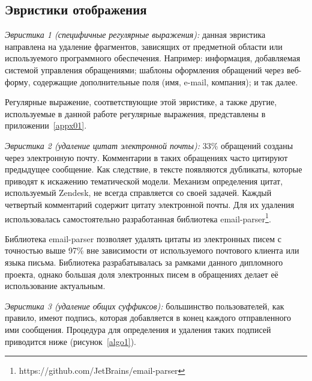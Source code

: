 \subsection{Эвристики отображения}
\label{subsec:lnfheur}

\textit{Эвристика 1 (специфичные регулярные выражения): }  данная эвристика направлена на удаление фрагментов, зависящих от предметной области или используемого программного обеспечения. Например: информация, добавляемая системой управления обращениями; шаблоны оформления обращений через веб-форму, содержащие дополнительные поля (имя, e-mail, компания); и так далее. 

Регулярные выражение, соответствующие этой эвристике, а также другие, используемые в данной работе регулярные выражения, представлены в приложении~\ref{appx01}.

\textit{Эвристика 2 (удаление цитат электронной почты):} 33\% обращений созданы через электронную почту. Комментарии в таких обращениях часто цитируют предыдущее сообщение. Как следствие, в тексте появляются дубликаты, которые приводят к искажению тематической модели. Механизм определения цитат, используемый Zendesk, не всегда справляется со своей задачей. Каждый четвертый комментарий содержит цитату электронной почты. Для их удаления использовалась самостоятельно разработанная библиотека email-parser\footnote{https://github.com/JetBrains/email-parser}.

Библиотека email-parser позволяет удалять цитаты из электронных писем с точностью выше 97\% вне зависимости от используемого почтового клиента или языка письма. Библиотека разрабатывалась за рамками данного дипломного проекта, однако большая доля электронных писем в обращениях делает её использование актуальным.

\textit{Эвристика 3 (удаление общих суффиксов):} большинство пользователей, как правило, имеют подпись, которая добавляется в конец каждого отправленного ими сообщения. Процедура для определения и удаления таких подписей приводится ниже (рисунок~\ref{algo1}).

